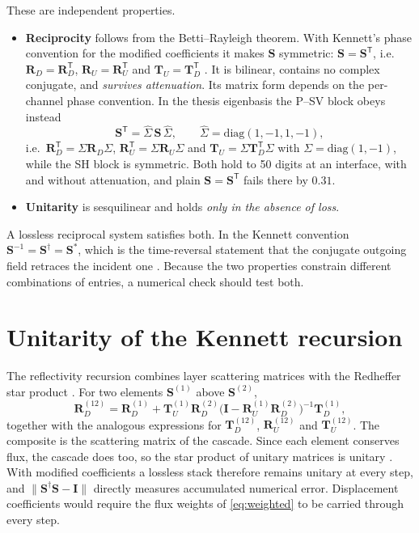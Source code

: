 \documentclass[11pt,a4paper]{article}
\newcommand{\bI}{\mathbf{I}}
\newcommand{\bT}{\mathbf{T}}
\newcommand{\bS}{\mathbf{S}}
\newcommand{\bR}{\mathbf{R}}
\newcommand{\RD}{\bR_{D}}
\newcommand{\RU}{\bR_{U}}
\newcommand{\TD}{\bT_{D}}
\newcommand{\TU}{\bT_{U}}
\newcommand{\herm}{^{\dagger}}
\begin{document}
These are independent properties.
\begin{itemize}
\item \textbf{Reciprocity} follows from the Betti--Rayleigh theorem.
  With Kennett's phase convention for the modified coefficients it
  makes $\bS$ symmetric: $\bS = \bS^{\mathsf T}$, i.e.\ $\RD =
  \RD^{\mathsf T}$, $\RU = \RU^{\mathsf T}$ and $\TU = \TD^{\mathsf T}$
  \citep{KennettKerry1979,VaratharajuluPao1976}. It is bilinear,
  contains no complex conjugate, and \emph{survives attenuation}.
  Its matrix form depends on the per-channel phase convention. In the
  thesis eigenbasis the P--SV block obeys instead
  \begin{equation}
    \bS^{\mathsf T} = \hat\Sigma\,\bS\,\hat\Sigma,\qquad
    \hat\Sigma = \mathrm{diag}(1,-1,1,-1),
    \label{eq:recip-thesis}
  \end{equation}
  i.e.\ $\RD^{\mathsf T} = \Sigma\RD\Sigma$, $\RU^{\mathsf T} =
  \Sigma\RU\Sigma$ and $\TU = \Sigma\TD^{\mathsf T}\Sigma$ with $\Sigma
  = \mathrm{diag}(1,-1)$, while the SH block is symmetric. Both hold to
  50 digits at an interface, with and without attenuation, and plain
  $\bS = \bS^{\mathsf T}$ fails there by $0.31$.
\item \textbf{Unitarity} is sesquilinear and holds \emph{only in the
  absence of loss}.
\end{itemize}
A lossless reciprocal system satisfies both. In the Kennett convention
$\bS^{-1} = \bS\herm = \bS^{*}$, which is the time-reversal statement that the conjugate
outgoing field retraces the incident one \citep{Waterman1976}. Because
the two properties constrain different combinations of entries, a
numerical check should test both.

\section{Unitarity of the Kennett recursion}
\label{sec:recursion}

The reflectivity recursion combines layer scattering matrices with the
Redheffer star product \citep{Redheffer1961,KennettKerry1979}. For two
elements $\bS^{(1)}$ above $\bS^{(2)}$,
\begin{equation}
  \RD^{(12)} = \RD^{(1)} + \TU^{(1)}\RD^{(2)}
    \bigl(\bI - \RU^{(1)}\RD^{(2)}\bigr)^{-1}\TD^{(1)},
  \label{eq:star}
\end{equation}
together with the analogous expressions for $\TD^{(12)}$, $\RU^{(12)}$
and $\TU^{(12)}$. The composite is the scattering matrix of the cascade.
Since each element conserves flux, the cascade does too, so the star
product of unitary matrices is unitary \citep{Pozar2012}. With modified
coefficients a lossless stack therefore remains unitary at every step,
and $\lVert \bS\herm\bS - \bI \rVert$ directly measures accumulated
numerical error. Displacement coefficients would require the flux
weights of \eqref{eq:weighted} to be carried through every step.
\end{document}
